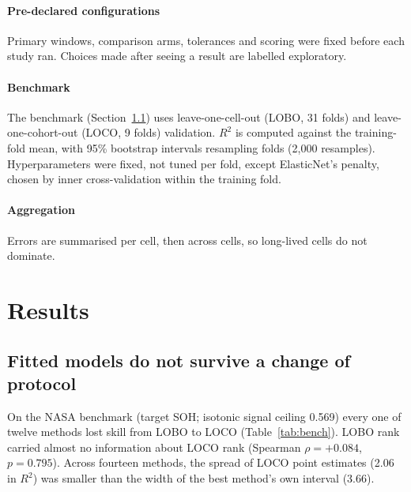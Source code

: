 \documentclass[preprint,12pt,authoryear]{elsarticle}
\begin{document}
\paragraph{Pre-declared configurations}
Primary windows, comparison arms, tolerances and scoring were fixed before each
study ran. Choices made after seeing a result are labelled exploratory.

\paragraph{Benchmark}
The benchmark (Section~\ref{sec:res-bench}) uses leave-one-cell-out (LOBO, 31
folds) and leave-one-cohort-out (LOCO, 9 folds) validation. $R^2$ is computed
against the training-fold mean, with 95\% bootstrap intervals resampling folds
(2{,}000 resamples). Hyperparameters were fixed, not tuned per fold, except
ElasticNet's penalty, chosen by inner cross-validation within the training
fold.

\paragraph{Aggregation}
Errors are summarised per cell, then across cells, so long-lived cells do not
dominate.

\section{Results}
\label{sec:results}

\subsection{Fitted models do not survive a change of protocol}
\label{sec:res-bench}

On the NASA benchmark (target SOH; isotonic signal ceiling 0.569) every one of
twelve methods lost skill from LOBO to LOCO (Table~\ref{tab:bench}). LOBO rank
carried almost no information about LOCO rank (Spearman $\rho = +0.084$,
$p = 0.795$). Across fourteen methods, the spread of LOCO point estimates (2.06
in $R^2$) was smaller than the width of the best method's own interval (3.66).
\end{document}
